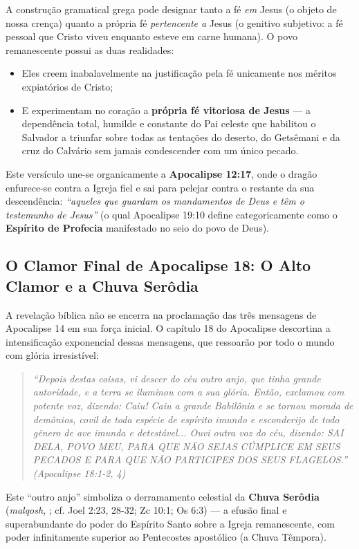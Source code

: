 A construção gramatical grega pode designar tanto a fé \textit{em} Jesus (o objeto de nossa crença) quanto a própria fé \textit{pertencente a} Jesus (o genitivo subjetivo: a fé pessoal que Cristo viveu enquanto esteve em carne humana). O povo remanescente possui as duas realidades:
\begin{itemize}
  \item Eles creem inabalavelmente na justificação pela fé unicamente nos méritos expiatórios de Cristo;
  \item E experimentam no coração a \textbf{própria fé vitoriosa de Jesus} — a dependência total, humilde e constante do Pai celeste que habilitou o Salvador a triunfar sobre todas as tentações do deserto, do Getsêmani e da cruz do Calvário sem jamais condescender com um único pecado.
\end{itemize}


Este versículo une-se organicamente a \textbf{Apocalipse 12:17}, onde o dragão enfurece-se contra a Igreja fiel e sai para pelejar contra o restante da sua descendência: \textit{``aqueles que guardam os mandamentos de Deus e têm o testemunho de Jesus''} (o qual Apocalipse 19:10 define categoricamente como o \textbf{Espírito de Profecia} manifestado no seio do povo de Deus).



\subsection{O Clamor Final de Apocalipse 18: O Alto Clamor e a Chuva Serôdia}


A revelação bíblica não se encerra na proclamação das três mensagens de Apocalipse 14 em sua força inicial. O capítulo 18 do Apocalipse descortina a intensificação exponencial dessas mensagens, que ressoarão por todo o mundo com glória irresistível:


\begin{quote}
\itshape \textit{``Depois destas coisas, vi descer do céu outro anjo, que tinha grande autoridade, e a terra se iluminou com a sua glória. Então, exclamou com potente voz, dizendo: Caiu! Caiu a grande Babilônia e se tornou morada de demônios, covil de toda espécie de espírito imundo e esconderijo de todo gênero de ave imunda e detestável... Ouvi outra voz do céu, dizendo: SAI DELA, POVO MEU, PARA QUE NÃO SEJAS CÚMPLICE EM SEUS PECADOS E PARA QUE NÃO PARTICIPES DOS SEUS FLAGELOS.''} (Apocalipse 18:1-2, 4)
\end{quote}


Este ``outro anjo'' simboliza o derramamento celestial da \textbf{Chuva Serôdia} (\textit{malqosh}, ; cf. Joel 2:23, 28-32; Zc 10:1; Os 6:3) — a efusão final e superabundante do poder do Espírito Santo sobre a Igreja remanescente, com poder infinitamente superior ao Pentecostes apostólico (a Chuva Têmpora).

